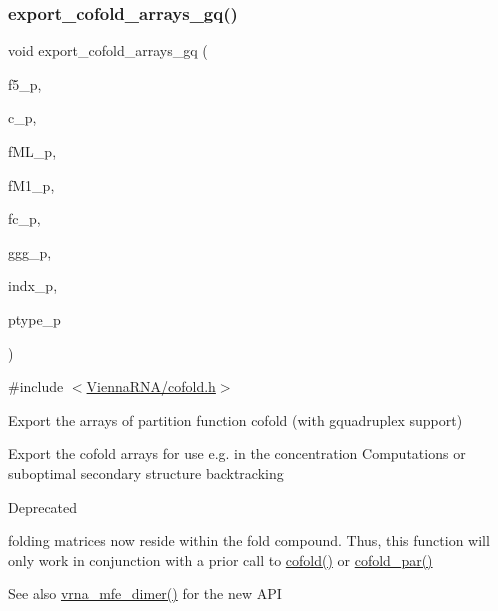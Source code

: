 \subsubsection{\texorpdfstring{export\+\_\+cofold\+\_\+arrays\+\_\+gq()}{export\_cofold\_arrays\_gq()}}
{\footnotesize\ttfamily void export\+\_\+cofold\+\_\+arrays\+\_\+gq (\begin{DoxyParamCaption}\item[{int $\ast$$\ast$}]{f5\+\_\+p,  }\item[{int $\ast$$\ast$}]{c\+\_\+p,  }\item[{int $\ast$$\ast$}]{f\+M\+L\+\_\+p,  }\item[{int $\ast$$\ast$}]{f\+M1\+\_\+p,  }\item[{int $\ast$$\ast$}]{fc\+\_\+p,  }\item[{int $\ast$$\ast$}]{ggg\+\_\+p,  }\item[{int $\ast$$\ast$}]{indx\+\_\+p,  }\item[{char $\ast$$\ast$}]{ptype\+\_\+p }\end{DoxyParamCaption})}



{\ttfamily \#include $<$\mbox{\hyperlink{cofold_8h}{Vienna\+R\+N\+A/cofold.\+h}}$>$}



Export the arrays of partition function cofold (with gquadruplex support) 

Export the cofold arrays for use e.\+g. in the concentration Computations or suboptimal secondary structure backtracking

\begin{DoxyRefDesc}{Deprecated}
\item[\mbox{\hyperlink{deprecated__deprecated000035}{Deprecated}}]folding matrices now reside within the fold compound. Thus, this function will only work in conjunction with a prior call to \mbox{\hyperlink{group__mfe__cofold_gabc8517f22cfe70595ee81fc837910d52}{cofold()}} or \mbox{\hyperlink{group__mfe__cofold_ga7612cfeeb1b793f1e4179b1eb53df1f3}{cofold\+\_\+par()}}\end{DoxyRefDesc}


\begin{DoxySeeAlso}{See also}
\mbox{\hyperlink{group__mfe__cofold_gaab22d10c1190f205f16a77cab9d5d3ee}{vrna\+\_\+mfe\+\_\+dimer()}} for the new A\+PI
\end{DoxySeeAlso}

